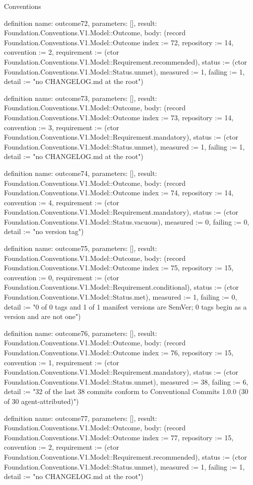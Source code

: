 \begin{lexlean}{Conventions}
\begin{semanticmodule}
definition{
  name: outcome72,
  parameters: [],
  result: Foundation.Conventions.V1.Model::Outcome,
  body: (record Foundation.Conventions.V1.Model::Outcome {index := 72, repository := 14, convention := 2, requirement := (ctor Foundation.Conventions.V1.Model::Requirement.recommended), status := (ctor Foundation.Conventions.V1.Model::Status.unmet), measured := 1, failing := 1, detail := "no CHANGELOG.md at the root"})
}

definition{
  name: outcome73,
  parameters: [],
  result: Foundation.Conventions.V1.Model::Outcome,
  body: (record Foundation.Conventions.V1.Model::Outcome {index := 73, repository := 14, convention := 3, requirement := (ctor Foundation.Conventions.V1.Model::Requirement.mandatory), status := (ctor Foundation.Conventions.V1.Model::Status.unmet), measured := 1, failing := 1, detail := "no CHANGELOG.md at the root"})
}

definition{
  name: outcome74,
  parameters: [],
  result: Foundation.Conventions.V1.Model::Outcome,
  body: (record Foundation.Conventions.V1.Model::Outcome {index := 74, repository := 14, convention := 4, requirement := (ctor Foundation.Conventions.V1.Model::Requirement.mandatory), status := (ctor Foundation.Conventions.V1.Model::Status.vacuous), measured := 0, failing := 0, detail := "no version tag"})
}

definition{
  name: outcome75,
  parameters: [],
  result: Foundation.Conventions.V1.Model::Outcome,
  body: (record Foundation.Conventions.V1.Model::Outcome {index := 75, repository := 15, convention := 0, requirement := (ctor Foundation.Conventions.V1.Model::Requirement.conditional), status := (ctor Foundation.Conventions.V1.Model::Status.met), measured := 1, failing := 0, detail := "0 of 0 tags and 1 of 1 manifest versions are SemVer; 0 tags begin as a version and are not one"})
}

definition{
  name: outcome76,
  parameters: [],
  result: Foundation.Conventions.V1.Model::Outcome,
  body: (record Foundation.Conventions.V1.Model::Outcome {index := 76, repository := 15, convention := 1, requirement := (ctor Foundation.Conventions.V1.Model::Requirement.mandatory), status := (ctor Foundation.Conventions.V1.Model::Status.unmet), measured := 38, failing := 6, detail := "32 of the last 38 commits conform to Conventional Commits 1.0.0 (30 of 30 agent-attributed)"})
}

definition{
  name: outcome77,
  parameters: [],
  result: Foundation.Conventions.V1.Model::Outcome,
  body: (record Foundation.Conventions.V1.Model::Outcome {index := 77, repository := 15, convention := 2, requirement := (ctor Foundation.Conventions.V1.Model::Requirement.recommended), status := (ctor Foundation.Conventions.V1.Model::Status.unmet), measured := 1, failing := 1, detail := "no CHANGELOG.md at the root"})
}


\end{semanticmodule}
\end{lexlean}
